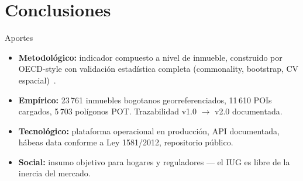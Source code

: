 \documentclass[aspectratio=169,11pt]{beamer}
\newcommand{\hi}[1]{\textcolor{inmuGreen}{\textbf{#1}}}
\begin{document}
\section{Conclusiones}

\begin{frame}{Aportes}
  \begin{itemize}
    \item \hi{Metodológico:} indicador compuesto a nivel de inmueble,
          construido por OECD-style con validación estadística completa
          (commonality, bootstrap, CV espacial)~\cite{nardo2008, roberts2017}.
    \item \hi{Empírico:} 23\,761 inmuebles bogotanos georreferenciados,
          11\,610 POIs cargados, 5\,703 polígonos POT. Trazabilidad
          v1.0 $\to$ v2.0 documentada.
    \item \hi{Tecnológico:} plataforma operacional en producción,
          API documentada, hábeas data conforme a Ley 1581/2012,
          repositorio público.
    \item \hi{Social:} insumo objetivo para hogares y reguladores ---
          el IUG es libre de la inercia del mercado.
  \end{itemize}
\end{frame}
\end{document}

